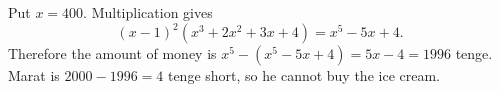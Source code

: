 Put $x=400$. Multiplication gives
\[(x-1)^2(x^3+2x^2+3x+4)=x^5-5x+4.\]
Therefore the amount of money is $x^5-(x^5-5x+4)=5x-4=1996$ tenge. Marat is $2000-1996=\boxed4$ tenge short, so he cannot buy the ice cream.
